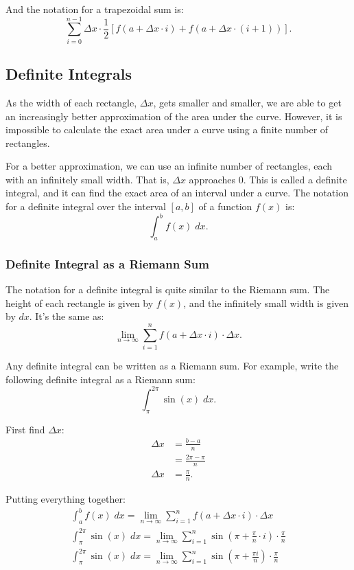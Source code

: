 \noindent And the notation for a trapezoidal sum is:
\[ \sum_{i = 0}^{n - 1} \Delta x \cdot \frac{1}{2} \left[ f(a + \Delta x \cdot i) + f(a + \Delta x \cdot (i + 1)) \right]. \]

\subsection{Definite Integrals}
As the width of each rectangle, $\Delta x$, gets smaller and smaller, we are able to get an increasingly better approximation of the area under the curve. However, it is impossible to calculate the exact area under a curve using a finite number of rectangles.

For a better approximation, we can use an infinite number of rectangles, each with an infinitely small width. That is, $\Delta x$ approaches $0$. This is called a definite integral, and it can find the exact area of an interval under a curve. The notation for a definite integral over the interval $[a, b]$ of a function $f(x)$ is:
\[ \int_a^b f(x) \; dx. \]

\subsubsection{Definite Integral as a Riemann Sum}
The notation for a definite integral is quite similar to the Riemann sum. The height of each rectangle is given by $f(x)$, and the infinitely small width is given by $dx$. It's the same as:
\[ \lim_{n \to \infty} \sum_{i = 1}^n f(a + \Delta x \cdot i) \cdot \Delta x. \]

Any definite integral can be written as a Riemann sum. For example, write the following definite integral as a Riemann sum:
\[ \int_\pi^{2 \pi} \sin(x) \; dx. \]

\noindent First find $\Delta x$:
\begin{align*}
	\Delta x &= \frac{b - a}{n} \\[5pt]
	&= \frac{2 \pi - \pi}{n} \\[5pt]
	\Delta x &= \frac{\pi}{n}.
\end{align*}

\noindent Putting everything together:
\begin{gather*}
	\int_a^b f(x) \; dx = \lim_{n \to \infty} \sum_{i = 1}^n f(a + \Delta x \cdot i) \cdot \Delta x \\[5pt]
	\int_\pi^{2 \pi} \sin(x) \; dx = \lim_{n \to \infty} \sum_{i = 1}^n \sin \left( \pi + \frac{\pi}{n} \cdot i \right) \cdot \frac{\pi}{n} \\[5pt]
	\int_\pi^{2 \pi} \sin(x) \; dx = \lim_{n \to \infty} \sum_{i = 1}^n \sin \left( \pi + \frac{\pi i}{n} \right) \cdot \frac{\pi}{n}
\end{gather*}

